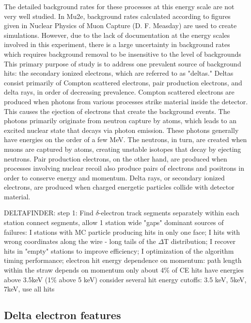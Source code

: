  The detailed background rates for these processes at this energy scale are not very
well studied. In Mu2e, background rates calculated according to figures given in Nuclear Physics of
Muon Capture (D. F. Measday) are used to create simulations. However, due to the lack of
documentation at the energy scales involved in this experiment, there is a large uncertainty in
background rates which requires background removal to be insensitive to the level of backgrounds
This primary purpose of study is to address one prevalent source of background hits: the
secondary ionized electrons, which are referred to as "deltas." Deltas consist primarily of Compton
scattered electrons, pair production electrons, and delta rays, in order of decreasing prevalence.
Compton scattered electrons are produced when photons from various processes strike material
inside the detector. This causes the ejection of electrons that create the background events. The
photons primarily originate from neutron capture by atoms, which leads to an excited nuclear state
that decays via photon emission. These photons generally have energies on the order of a few MeV.
The neutrons, in turn, are created when muons are captured by atoms, creating unstable isotopes that
decay by ejecting neutrons. Pair production electrons, on the other hand, are produced when
processes involving nuclear recoil also produce pairs of electrons and positrons in order to conserve
energy and momentum. Delta rays, or secondary ionized electrons, are produced when charged
energetic particles collide with detector material.






DELTAFINDER:
step 1: Find $\delta$-electron track segments separately within each station
connect segments, allow 1 station wide "gaps"
dominant sources of failures:
I stations with MC particle producing hits in only one face;
I hits with wrong coordinates along the wire - long tails of the $\Delta$T distribution;
I recover hits in "empty" stations to improve efficiency;
I optimization of the algorithm timing performance;
electron hit energy dependence on momentum: path length within the straw depends on momentum
only about 4\% of CE hits have energies above 3.5keV (1\% above 5 keV)
consider several hit energy cutoffs: 3.5 keV, 5keV, 7keV, use all hits




\subsection{Delta electron features}








